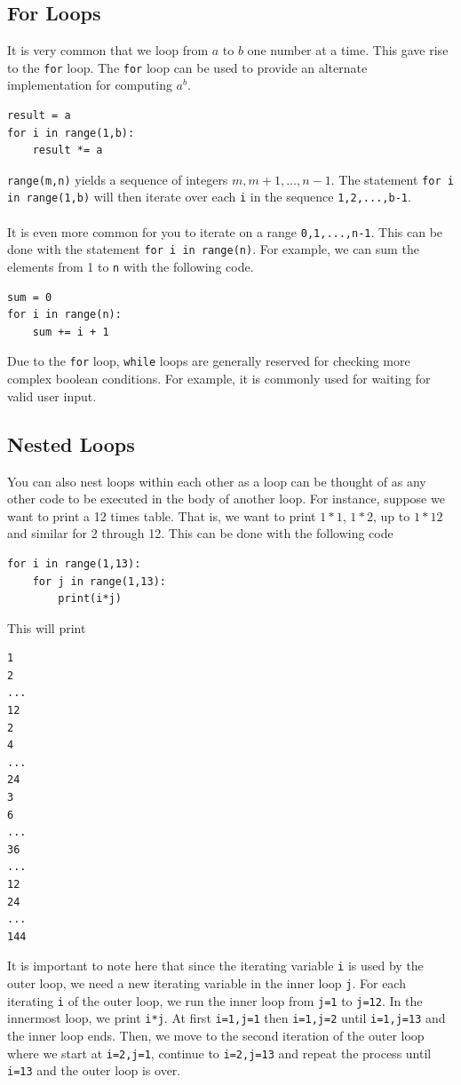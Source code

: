 \documentclass{article}
\begin{document}
\subsection{For Loops}
It is very common that we loop from $a$ to $b$ one number at a time. This gave rise to the \texttt{for} loop. The \texttt{for} loop can be used to provide an alternate implementation for computing $a^b$.
\begin{verbatim}
result = a
for i in range(1,b):
    result *= a
\end{verbatim}
\texttt{range(m,n)} yields a sequence of integers $m,m+1,\dots,n-1$. The statement \texttt{for i in range(1,b)} will then iterate over each \texttt{i} in the sequence \texttt{1,2,...,b-1}.\\\\
It is even more common for you to iterate on a range \texttt{0,1,...,n-1}. This can be done with the statement \texttt{for i in range(n)}. For example, we can sum the elements from 1 to \texttt{n} with the following code.
\begin{verbatim}
sum = 0
for i in range(n):
    sum += i + 1
\end{verbatim}
Due to the \texttt{for} loop, \texttt{while} loops are generally reserved for checking more complex boolean conditions. For example, it is commonly used for waiting for valid user input. 

\subsection{Nested Loops}
You can also nest loops within each other as a loop can be thought of as any other code to be executed in the body of another loop. For instance, suppose we want to print a 12 times table. That is, we want to print $1*1$, $1*2$, up to $1*12$ and similar for 2 through 12. This can be done with the following code
\begin{verbatim}
for i in range(1,13):
    for j in range(1,13):
        print(i*j)
\end{verbatim}
This will print
\begin{verbatim}
1
2
...
12
2
4
...
24
3
6
...
36
...
12
24
...
144
\end{verbatim}
It is important to note here that since the iterating variable \texttt{i} is used by the outer loop, we need a new iterating variable in the inner loop \texttt{j}. For each iterating \texttt{i} of the outer loop, we run the inner loop from \texttt{j=1} to \texttt{j=12}. In the innermost loop, we print \texttt{i*j}. At first \texttt{i=1,j=1} then \texttt{i=1,j=2} until \texttt{i=1,j=13} and the inner loop ends. Then, we move to the second iteration of the outer loop where we start at \texttt{i=2,j=1}, continue to \texttt{i=2,j=13} and repeat the process until \texttt{i=13} and the outer loop is over.
\end{document}
